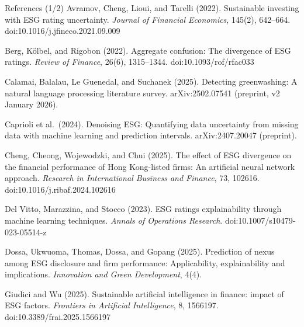\documentclass[aspectratio=169,11pt]{beamer}
\begin{document}
\begin{frame}[t]{References (1/2)}
\tiny
\setlength{\parskip}{3pt}
Avramov, Cheng, Lioui, and Tarelli (2022). Sustainable investing with ESG rating uncertainty. \emph{Journal of Financial Economics}, 145(2), 642--664. doi:10.1016/j.jfineco.2021.09.009

Berg, K\"olbel, and Rigobon (2022). Aggregate confusion: The divergence of ESG ratings. \emph{Review of Finance}, 26(6), 1315--1344. doi:10.1093/rof/rfac033

Calamai, Balalau, Le Guenedal, and Suchanek (2025). Detecting greenwashing: A natural language processing literature survey. arXiv:2502.07541 (preprint, v2 January 2026).

Caprioli et al.\ (2024). Denoising ESG: Quantifying data uncertainty from missing data with machine learning and prediction intervals. arXiv:2407.20047 (preprint).

Cheng, Cheong, Wojewodzki, and Chui (2025). The effect of ESG divergence on the financial performance of Hong Kong-listed firms: An artificial neural network approach. \emph{Research in International Business and Finance}, 73, 102616. doi:10.1016/j.ribaf.2024.102616

Del Vitto, Marazzina, and Stocco (2023). ESG ratings explainability through machine learning techniques. \emph{Annals of Operations Research}. doi:10.1007/s10479-023-05514-z

Dossa, Ukwuoma, Thomas, Dossa, and Gopang (2025). Prediction of nexus among ESG disclosure and firm performance: Applicability, explainability and implications. \emph{Innovation and Green Development}, 4(4).

Giudici and Wu (2025). Sustainable artificial intelligence in finance: impact of ESG factors. \emph{Frontiers in Artificial Intelligence}, 8, 1566197. doi:10.3389/frai.2025.1566197
\end{frame}
\end{document}
